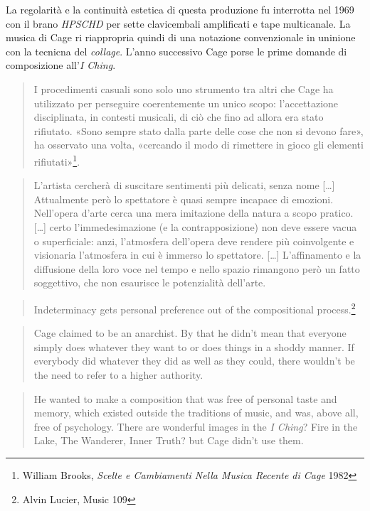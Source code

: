 La regolarit\`a e la continuit\`a estetica di questa produzione fu interrotta nel 1969
con il brano \emph{HPSCHD} per sette clavicembali amplificati e tape multicanale.
La musica di Cage ri riappropria quindi di una notazione convenzionale in uninione
con la tecnicna del \emph{collage}. L'anno successivo Cage porse le prime domande
di composizione all'\emph{I Ching}.

\begin{quote}
	I procedimenti casuali sono solo uno strumento tra altri che Cage ha utilizzato
	per perseguire coerentemente un unico scopo: l'accettazione disciplinata, in
	contesti musicali, di ci\`o che fino ad allora era stato rifiutato. «Sono sempre
	stato dalla parte delle cose che non si devono fare», ha osservato una volta,
	«cercando il modo di rimettere in gioco gli elementi rifiutati»\footnote{William
	Brooks, \emph{Scelte e Cambiamenti Nella Musica Recente di Cage} 1982}.
\end{quote}

\centering{***}

\begin{quote}
	L'artista cercher\`a di suscitare sentimenti pi\`u delicati, senza nome [\ldots]
	Attualmente per\`o lo spettatore \`e quasi sempre incapace di emozioni.
	Nell'opera d'arte cerca una mera imitazione della natura a scopo pratico.
	[\ldots] certo l'immedesimazione (e la contrapposizione) non deve essere
	vacua o superficiale: anzi, l'atmosfera dell'opera deve rendere pi\`u
	coinvolgente e visionaria l'atmosfera in cui \`e immerso lo spettatore. [\ldots]
	L'affinamento e la diffusione della loro voce nel tempo e nello spazio
	rimangono per\`o un fatto soggettivo, che non esaurisce le potenzialit\`a dell'arte.
\end{quote}

\begin{quote}
	Indeterminacy gets personal preference out of the compositional process.\footnote{Alvin Lucier, Music 109}
\end{quote}

\begin{quote}
    Cage claimed to be an anarchist. By that he didn't mean that everyone simply does whatever they want to or does things in a shoddy manner. If everybody did whatever they did as well as they could, there wouldn't be the need to refer to a higher authority.
\end{quote}

\begin{quote}
	He wanted to make a composition that was free of personal taste and memory, which existed outside the traditions of music, and was, above all, free of psychology.
There are wonderful images in the \emph{I Ching}? Fire in the Lake, The Wanderer, Inner Truth? but Cage didn't use them.
\end{quote}

